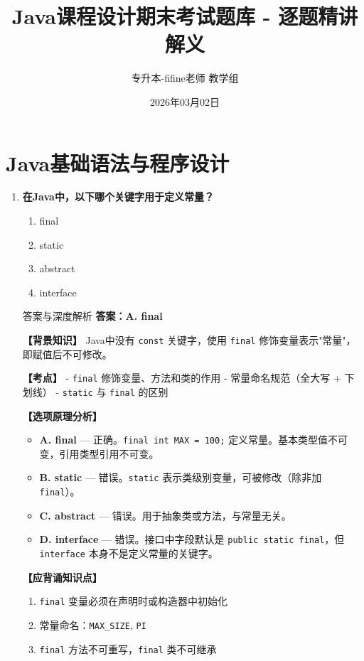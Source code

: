 \documentclass[12pt, a4paper]{ctexart} %
\title{\textcolor{myblue}{\textbf{Java课程设计期末考试题库 - 逐题精讲解义}}}
\author{专升本-fifine老师 教学组}
\date{2026年03月02日}
\newcommand{\code}[1]{\texttt{#1}}
\begin{document}
\maketitle
\thispagestyle{empty}
\newpage

\tableofcontents
\newpage

\section{Java基础语法与程序设计}

\begin{enumerate}[label=\textbf{\arabic*.}]

	\item \textbf{在Java中，以下哪个关键字用于定义常量？}
	      \begin{enumerate}[label=\Alph*.]
		      \item final
		      \item static
		      \item abstract
		      \item interface
	      \end{enumerate}

	      \begin{bluebox}{答案与深度解析}
		      \textbf{答案：A. final}

		      \textbf{【背景知识】}
		      Java中没有 \code{const} 关键字，使用 \code{final} 修饰变量表示"常量"，即赋值后不可修改。

		      \textbf{【考点】}
		      - \code{final} 修饰变量、方法和类的作用
		      - 常量命名规范（全大写 + 下划线）
		      - \code{static} 与 \code{final} 的区别

		      \textbf{【选项原理分析】}
		      \begin{itemize}[leftmargin=*]
			      \item \textbf{A. final} — 正确。\code{final\ int\ MAX\ =\ 100;} 定义常量。基本类型值不可变，引用类型引用不可变。
			      \item \textbf{B. static} — 错误。\code{static} 表示类级别变量，可被修改（除非加 \code{final}）。
			      \item \textbf{C. abstract} — 错误。用于抽象类或方法，与常量无关。
			      \item \textbf{D. interface} — 错误。接口中字段默认是 \code{public\ static\ final}，但 \code{interface} 本身不是定义常量的关键字。
		      \end{itemize}

		      \textbf{【应背诵知识点】}
		      \begin{enumerate}
			      \item \code{final} 变量必须在声明时或构造器中初始化
			      \item 常量命名：\code{MAX\_SIZE}, \code{PI}
			      \item \code{final} 方法不可重写，\code{final} 类不可继承
		      \end{enumerate}
	      \end{bluebox}


\end{enumerate}
\end{document}
